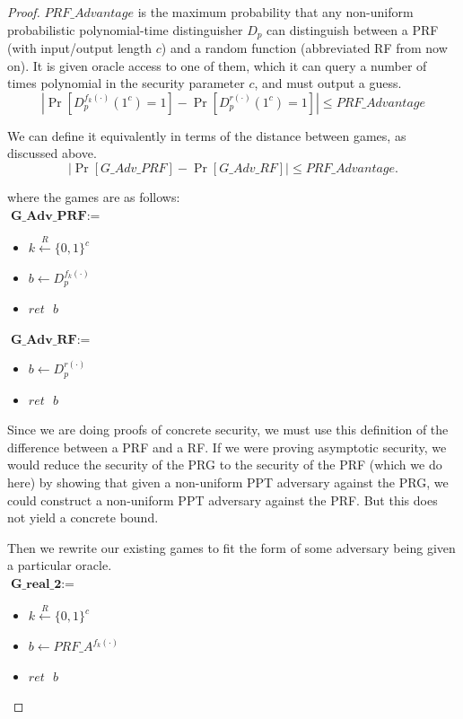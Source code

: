 \documentclass[12pt,lot, lof]{puthesis}
\newenvironment{game}
{ \begin{itemize}[noitemsep,nolistsep] 
}
{ \end{itemize}                  }
\newcommand{\s} {\textrm{ }}
\newcommand{\bt}{\{0,1\}}
\begin{document}
{\begin{proof}
$PRF\_Advantage$ is the maximum probability that any non-uniform probabilistic polynomial-time distinguisher $D_p$ can distinguish between a PRF (with input/output length $c$) and a random function (abbreviated RF from now on). It is given oracle access to one of them, which it can query a number of times polynomial in the security parameter $c$, and must output a guess.
$$| \Pr[ D_p^{f_k(\cdot)}(1^c) = 1] - \Pr[ D_p^{r(\cdot)}(1^c)=1 ] | \leq PRF\_Advantage$$

We can define it equivalently in terms of the distance between games, as discussed above.
$$| \Pr[ G\_Adv\_PRF] - \Pr[G\_Adv\_RF] | \leq PRF\_Advantage.$$

where the games are as follows:\\

$\textbf{G\_Adv\_PRF} := $
\begin{game}
\item[] $k \xleftarrow{R} \bt^c$
\item[] $b \leftarrow D_p^{f_k(\cdot)}$ 
\item[] $ret \s b$ \\
\end{game}

$\textbf{G\_Adv\_RF} := $
\begin{game}
\item[] $b \leftarrow D_p^{r(\cdot)}$ 
\item[] $ret \s b$ \\
\end{game}

Since we are doing proofs of concrete security, we must use this definition of the difference between a PRF and a RF. If we were proving asymptotic security, we would reduce the security of the PRG to the security of the PRF (which we do here) by showing that given a non-uniform PPT adversary against the PRG, we could construct a non-uniform PPT adversary against the PRF. But this does not yield a concrete bound.

Then we rewrite our existing games to fit the form of some adversary being given a particular oracle.\\

$\textbf{G\_real\_2} := $
\begin{game}
\item[] $k \xleftarrow{R} \bt^c$
\item[] $b \leftarrow PRF\_A^{f_k(\cdot)}$ 
\item[] $ret \s b$ \\
\end{game}


\end{proof}}
\end{document}
